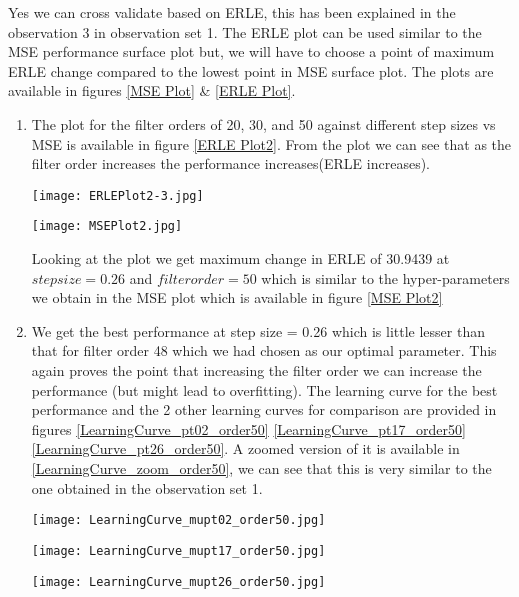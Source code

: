 \documentclass[conference]{IEEEtran}
\begin{document}
Yes we can cross validate based on ERLE, this has been explained in the observation 3 in observation set 1. The ERLE plot can be used similar to the MSE performance surface plot but, we will have to choose a point of maximum ERLE change compared to the lowest point in MSE surface plot. The plots are available in figures \ref{MSE Plot} \& \ref{ERLE Plot}.

\begin{enumerate}
\item The plot for the filter orders of 20, 30, and 50 against different step sizes vs MSE is available in figure \ref{ERLE Plot2}. From the plot we can see that as the filter order increases the performance increases(ERLE increases).

\begin{figure*}
\centering
\texttt{[image: ERLEPlot2-3.jpg]}
\caption{ERLE for Filter Order 10 , 20 and 50}
\label{ERLE Plot2}
\end{figure*}
\begin{figure*}
\centering
\texttt{[image: MSEPlot2.jpg]}
\caption{ERLE for Filter Order 10 , 20 and 50}
\label{MSE Plot2}
\end{figure*}

Looking at the plot we get maximum change in ERLE of 30.9439 at $step size = 0.26$ and $filter order = 50$ which is similar to the hyper-parameters we obtain in the MSE plot which is available in figure \ref{MSE Plot2}

\item We get the best performance at step size = 0.26 which is little lesser than that for filter order 48 which we had chosen as our optimal parameter. This again proves the point that increasing the filter order we can increase the performance (but might lead to overfitting). The learning curve for the best performance and the 2 other learning curves for comparison are provided in figures \ref{LearningCurve_pt02_order50} \ref{LearningCurve_pt17_order50} \ref{LearningCurve_pt26_order50}. A zoomed version of it is available in \ref{LearningCurve_zoom_order50}, we can see that this is very similar to the one obtained in the observation set 1.

\begin{figure*}
\centering
\texttt{[image: LearningCurve\_mupt02\_order50.jpg]}
\caption{ Learning Curve Filter order 50 mu 0.02}
\label{LearningCurve_pt02_order50}
\end{figure*}
\begin{figure*}
\centering
\texttt{[image: LearningCurve\_mupt17\_order50.jpg]}
\caption{ Learning Curve Filter order 50 mu 0.17}
\label{LearningCurve_pt17_order50}
\end{figure*}
\begin{figure*}
\centering
\texttt{[image: LearningCurve\_mupt26\_order50.jpg]}
\caption{ Learning Curve Filter order 50 mu 0.26}
\label{LearningCurve_pt26_order50}
\end{figure*}



\end{enumerate}
\end{document}
